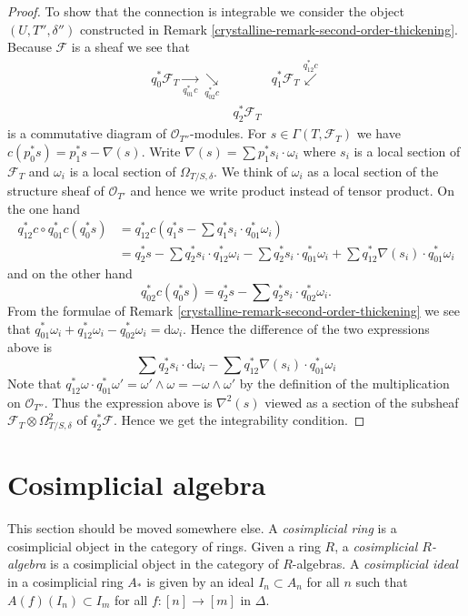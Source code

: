 \begin{proof}
\medskip\noindent
To show that the connection is integrable we consider the
object $(U, T'', \delta'')$ constructed in
Remark \ref{crystalline-remark-second-order-thickening}.
Because $\mathcal{F}$ is a sheaf we see that
$$
\begin{array}{ccc}q_0^*\mathcal{F}_T \underset{q_{01}^*c}{\longrightarrow}\underset{q_{02}^*c}{\searrow} &  & q_1^*\mathcal{F}_T \overset{q_{12}^*c}{\swarrow} \\  & q_2^*\mathcal{F}_T & \end{array}
$$
is a commutative diagram of $\mathcal{O}_{T''}$-modules. For
$s \in \Gamma(T, \mathcal{F}_T)$ we have
$c(p_0^*s) = p_1^*s - \nabla(s)$. Write
$\nabla(s) = \sum p_1^*s_i \cdot \omega_i$ where $s_i$ is a local section
of $\mathcal{F}_T$ and $\omega_i$ is a local section of $\Omega_{T/S, \delta}$.
We think of $\omega_i$ as a local section of the structure
sheaf of $\mathcal{O}_{T'}$ and hence we write product instead of tensor
product. On the one hand
\begin{align*}
q_{12}^*c \circ q_{01}^*c(q_0^*s) & =
q_{12}^*c(q_1^*s - \sum q_1^*s_i \cdot q_{01}^*\omega_i) \\
& =
q_2^*s - \sum q_2^*s_i \cdot q_{12}^*\omega_i -
\sum q_2^*s_i \cdot q_{01}^*\omega_i +
\sum q_{12}^*\nabla(s_i) \cdot q_{01}^*\omega_i
\end{align*}
and on the other hand
$$
q_{02}^*c(q_0^*s) = q_2^*s - \sum q_2^*s_i \cdot q_{02}^*\omega_i.
$$
From the formulae of Remark \ref{crystalline-remark-second-order-thickening} we see
that
$q_{01}^*\omega_i + q_{12}^*\omega_i - q_{02}^*\omega_i = \text{d}\omega_i$.
Hence the difference of the two expressions above is
$$
\sum q_2^*s_i \cdot \text{d}\omega_i -
\sum q_{12}^*\nabla(s_i) \cdot q_{01}^*\omega_i
$$
Note that
$q_{12}^*\omega \cdot q_{01}^*\omega' = \omega' \wedge \omega =
- \omega \wedge \omega'$ by the definition of the multiplication on
$\mathcal{O}_{T''}$. Thus the expression above is $\nabla^2(s)$ viewed
as a section of the subsheaf $\mathcal{F}_T \otimes \Omega^2_{T/S, \delta}$ of
$q_2^*\mathcal{F}$. Hence we get the integrability condition.
\end{proof}

\section{Cosimplicial algebra}
\label{crystalline-section-cosimplicial}
This section should be moved somewhere else. A
{\it cosimplicial ring} is a cosimplicial object
in the category of rings. Given a ring $R$, a
{\it cosimplicial $R$-algebra} is a cosimplicial object in the
category of $R$-algebras. A {\it cosimplicial ideal} in a cosimplicial
ring $A_*$ is given by an ideal $I_n \subset A_n$ for all $n$ such
that $A(f)(I_n) \subset I_m$ for all $f : [n] \to [m]$ in $\Delta$.

